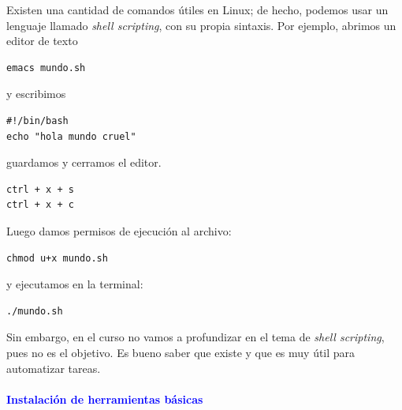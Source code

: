 \documentclass[12pt]{article}
\begin{document}
Existen una cantidad de comandos útiles en Linux; de hecho, podemos usar un lenguaje llamado 
\textit{shell scripting}, con su propia sintaxis. Por ejemplo, abrimos un editor de texto 
\begin{lstlisting}
emacs mundo.sh
\end{lstlisting}  
y escribimos 
\begin{lstlisting}
#!/bin/bash
echo "hola mundo cruel"
\end{lstlisting}  
guardamos y cerramos el editor.
\begin{lstlisting}
ctrl + x + s
ctrl + x + c
\end{lstlisting} 
Luego damos permisos de ejecución al archivo:
\begin{lstlisting}
chmod u+x mundo.sh
\end{lstlisting}
y ejecutamos en la terminal:
\begin{lstlisting}
./mundo.sh
\end{lstlisting}
Sin embargo, en el curso no vamos a profundizar en el tema de \textit{shell scripting}, pues no es el objetivo. 
Es bueno saber que existe y que es muy útil para automatizar tareas.




\paragraph{\textcolor{blue}{Instalación de herramientas básicas}}
\end{document}
